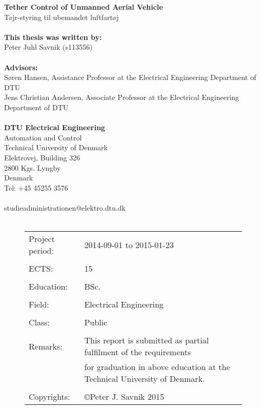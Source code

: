 \noindent
\textbf{Tether Control of Unmanned Aerial Vehicle}\\
Tøjr-styring til ubemandet luftfartøj\\
\\
\textbf{This thesis was written by:}\\
Peter Juhl Savnik (s113556)\\
\\
\textbf{Advisors:}\\
Søren Hansen, Assistance Professor at the Electrical Engineering Department of DTU\\
Jens Christian Andersen, Associate Professor at the Electrical Engineering Department of DTU\\
\\
\textbf{DTU Electrical Engineering} \\
Automation and Control\\
Technical University of Denmark\\
Elektrovej, Building 326\\
2800 Kgs. Lyngby\\
Denmark\\
Tel: +45 45255 3576\\
\\
studieadministrationen@elektro.dtu.dk\\
\\
\begin{figure}[b]
\begin{tabular}{ll}
Project period: & 2014-09-01 to 2015-01-23\\
 & \\
ECTS: & 15\\
 & \\
Education: & BSc.\\
 & \\
Field: & Electrical Engineering\\
 & \\
Class: & Public\\
 & \\
Remarks: & This report is submitted as partial fulfilment of the requirements\\
 & for graduation in above education at the Technical University of Denmark.\\
 & \\
Copyrights: & \copyright Peter J. Savnik 2015
\end{tabular}
\end{figure}

